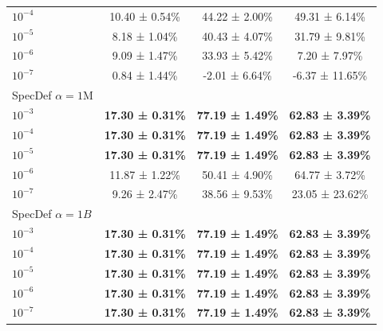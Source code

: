 \documentclass{article}
\theoremstyle{plain}
\theoremstyle{definition}
\theoremstyle{remark}
\begin{document}
\begin{table}[!htp]
\begin{sc}
\begin{tabular}{lccc}
\rowcolor{green!10}
\hspace{1mm} $10^{-4}$ & 10.40 ± 0.54\% & 44.22 ± 2.00\% & 49.31 ± 6.14\% \\
\rowcolor{green!10}
\hspace{1mm} $10^{-5}$ & 8.18 ± 1.04\% & 40.43 ± 4.07\% & 31.79 ±  9.81\% \\
\rowcolor{green!10}
\hspace{1mm} $10^{-6}$ & 9.09 ± 1.47\% & 33.93 ± 5.42\% & 7.20 ± 7.97\% \\
\hspace{1mm} $10^{-7}$ & 0.84 ± 1.44\% & -2.01 ± 6.64\% & -6.37 ± 11.65\% \\
\midrule
SpecDef $\alpha=1\mathrm{M}$ \\
\rowcolor{green!10}
\hspace{1mm} $10^{-3}$ & \textbf{17.30 ± 0.31\%} & \textbf{77.19 ± 1.49\%} & \textbf{62.83 ± 3.39\%} \\
\rowcolor{green!10}
\hspace{1mm} $10^{-4}$ & \textbf{17.30 ± 0.31\%} & \textbf{77.19 ± 1.49\%} & \textbf{62.83 ± 3.39\%} \\
\rowcolor{green!10}
\hspace{1mm} $10^{-5}$ & \textbf{17.30 ± 0.31\%} & \textbf{77.19 ± 1.49\%} & \textbf{62.83 ± 3.39\%} \\
\rowcolor{green!10}
\hspace{1mm} $10^{-6}$ & 11.87 ± 1.22\% & 50.41 ± 4.90\% & 64.77 ± 3.72\% \\
\rowcolor{green!10}
\hspace{1mm} $10^{-7}$ & 9.26 ± 2.47\% & 38.56 ± 9.53\% & 23.05 ± 23.62\% \\
SpecDef $\alpha=1B$ \\
\rowcolor{green!10}
\hspace{1mm} $10^{-3}$ & \textbf{17.30 ± 0.31\%} & \textbf{77.19 ± 1.49\%} & \textbf{62.83 ± 3.39\%} \\
\rowcolor{green!10}
\hspace{1mm} $10^{-4}$ & \textbf{17.30 ± 0.31\%} & \textbf{77.19 ± 1.49\%} & \textbf{62.83 ± 3.39\%} \\
\rowcolor{green!10}
\hspace{1mm} $10^{-5}$ & \textbf{17.30 ± 0.31\%} & \textbf{77.19 ± 1.49\%} & \textbf{62.83 ± 3.39\%} \\
\rowcolor{green!10}
\hspace{1mm} $10^{-6}$ & \textbf{17.30 ± 0.31\%} & \textbf{77.19 ± 1.49\%} & \textbf{62.83 ± 3.39\%} \\
\rowcolor{green!10}
\hspace{1mm} $10^{-7}$ & \textbf{17.30 ± 0.31\%} & \textbf{77.19 ± 1.49\%} & \textbf{62.83 ± 3.39\%} \\
\bottomrule
\end{tabular}

\end{sc}
\label{tab:vangogh_lr_ablations_2}
\end{table}
\end{document}
